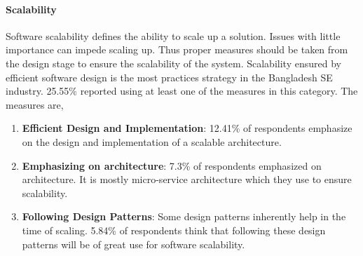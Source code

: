 \paragraph{Scalability}

 Software scalability defines the ability to scale up a solution. Issues with little importance can impede scaling up. Thus proper measures should be taken from the design stage to ensure the scalability of the system. Scalability ensured by efficient software design is the most practices strategy in the Bangladesh SE industry. 25.55\% reported using at least one of the measures in this category. The measures are,
 \begin{enumerate}[label=(\alph*)]
 
     \item \textbf{Efficient Design and Implementation}: 12.41\% of respondents emphasize on the design and implementation of a scalable architecture. 
    
     \item \textbf{Emphasizing on architecture}: 7.3\% of respondents emphasized on architecture. It is mostly micro-service architecture which they use to ensure scalability.

    
    \item \textbf{Following Design Patterns}: Some design patterns inherently help in the time of scaling. 5.84\% of respondents think that following these design patterns will be of great use for software scalability.
 
 \end{enumerate}
 
